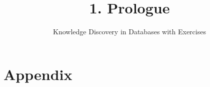 \documentclass[aspectratio=169,t,table]{beamer}
\title[KDDmUe~1.~Prologue]{1. Prologue} %
\subtitle{Knowledge Discovery in Databases with Exercises}
\begin{document}
\maketitle




\section*{Appendix}


\end{document}
